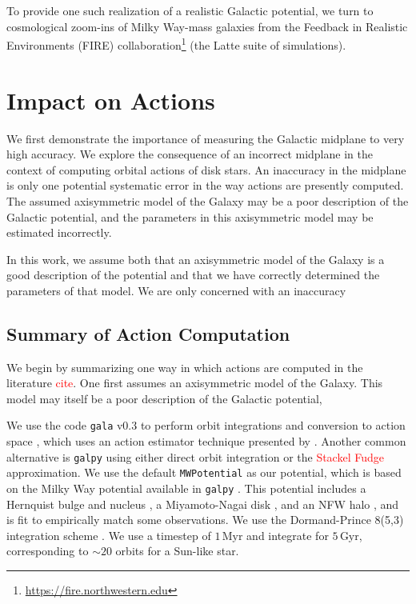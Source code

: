\documentclass[twocolumn]{aastex62}
\newcommand{\Gus}[1]{\textcolor{red}{#1}}
\newcommand{\Myr}{\text{Myr}}
\newcommand{\Gyr}{\text{Gyr}}
\begin{document}
To provide one such realization of a realistic Galactic potential, we turn to
cosmological zoom-ins of Milky Way-mass galaxies from the Feedback in
Realistic Environments (FIRE)
collaboration\footnote{\url{https://fire.northwestern.edu}} (the Latte suite
of simulations).

\section{Impact on Actions} \label{sec:ref_frame}
We first demonstrate the importance of measuring the Galactic midplane to very
high accuracy. We explore the consequence of an incorrect midplane in the
context of computing orbital actions of disk stars. An inaccuracy in the
midplane is only one potential systematic error in the way actions are
presently computed. The assumed axisymmetric model of the Galaxy may be a poor
description of the Galactic potential, and the parameters in this axisymmetric
model may be estimated incorrectly.

In this work, we assume both that an axisymmetric model of the Galaxy is a
good description of the potential and that we have correctly determined the
parameters of that model. We are only concerned with an inaccuracy

\subsection{Summary of Action Computation} \label{ssec:action_comp}
We begin by summarizing one way in which actions are computed in the
literature \Gus{cite}. One first assumes an axisymmetric model of the Galaxy.
This model may itself be a poor description of the Galactic potential,

We use the code \texttt{gala} v0.3 to perform orbit integrations and
conversion to action space \citep{2017JOSS....2..388P,Price-Whelan:2018},
which uses an action estimator technique presented by
\citet{2014MNRAS.441.3284S}. Another common alternative is \texttt{galpy}
\citep{2015ApJS..216...29B} using either direct orbit integration or the
\Gus{Stackel Fudge} approximation. We use the default \texttt{MWPotential} as
our potential, which is based on the Milky Way potential available in
\texttt{galpy} \citep{2015ApJS..216...29B}. This potential includes a
Hernquist bulge and nucleus \citep{1990ApJ...356..359H}, a Miyamoto-Nagai disk
\citep{1975PASJ...27..533M}, and an NFW halo \citep{1997ApJ...490..493N}, and
is fit to empirically match some observations. We use the Dormand-Prince
8(5,3) integration scheme \citep{Dormand80:integrator}. We use a timestep of
$1\,\Myr$ and integrate for $5\,\Gyr$, corresponding to $\sim 20$ orbits for a
Sun-like star.
\end{document}
